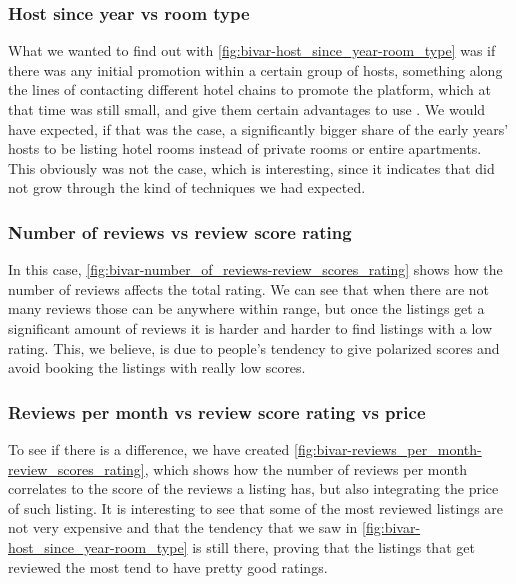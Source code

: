 \pagebreak

\subsubsection{Host since year vs room type}



What we wanted to find out with \cref{fig:bivar-host_since_year-room_type} was
if there was any initial promotion within a certain group of hosts, something
along the lines of contacting different hotel chains to promote the platform,
which at that time was still small, and give them certain advantages to use
\airbnb.
We would have expected, if that was the case, a significantly bigger share of
the early years' hosts to be listing hotel rooms instead of private rooms or
entire apartments.
This obviously was not the case, which is interesting, since it indicates that
\airbnb did not grow through the kind of techniques we had expected.


\pagebreak
\subsubsection{Number of reviews vs review score rating}


 In this case, \cref{fig:bivar-number_of_reviews-review_scores_rating} shows how
 the number of reviews affects the total rating. We can see that when there are
 not many reviews those can be anywhere within range, but once the listings get
 a significant amount of reviews it is harder and harder to find listings with a
 low rating. This, we believe, is due to people's tendency to give polarized
 scores and avoid booking the listings with really low scores.

\pagebreak
\subsubsection{Reviews per month vs review score rating vs price}


 To see if there is a difference, we have created
 \cref{fig:bivar-reviews_per_month-review_scores_rating}, which shows how the
 number of reviews per month correlates to the score of the reviews a listing
 has, but also integrating the price of such listing. It is interesting to see
 that some of the most reviewed listings are not very expensive and that the
 tendency that we saw in \cref{fig:bivar-host_since_year-room_type} is still
 there, proving that the listings that get reviewed the most tend to have pretty
 good ratings.

